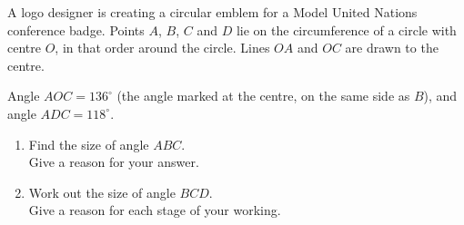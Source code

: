 \begin{question}
\noindent A logo designer is creating a circular emblem for a Model United Nations conference badge. Points $A$, $B$, $C$ and $D$ lie on the circumference of a circle with centre $O$, in that order around the circle. Lines $OA$ and $OC$ are drawn to the centre.

Angle $AOC = 136^\circ$ (the angle marked at the centre, on the same side as $B$), and angle $ADC = 118^\circ$.

\begin{center}
\end{center}

\begin{enumerate}
    \item[(a)] Find the size of angle $ABC$.\\
    Give a reason for your answer.

    \vspace{4cm}

    \item[(b)] Work out the size of angle $BCD$.\\
    Give a reason for each stage of your working.

    \vspace{4cm}
\end{enumerate}
\end{question}
